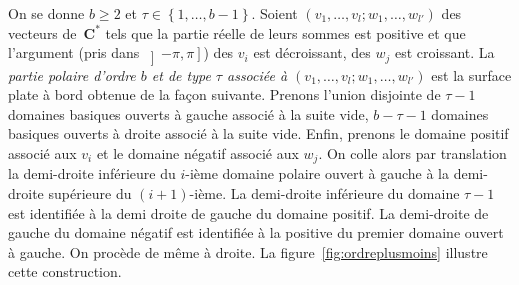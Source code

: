 \documentclass[11pt]{article}
\numberwithin{equation}{section}\renewcommand{\proofname}{Démonstration}
\newcommand{\CC}{\mathbf{C}}
\theoremstyle{definition}
\begin{document}
On se donne $b\geq2$ et $\tau\in\left\{1,\dots,b-1\right\}$.
Soient $(v_{1},\dots,v_{l};w_{1},\dots,w_{l'})$ des vecteurs de~$\CC^{\ast}$ tels que la partie réelle de leurs sommes est positive et que l'argument (pris dans $\left]-\pi,\pi\right]$) des $v_{i}$ est décroissant, des $w_{j}$ est croissant.
La \emph{partie polaire d'ordre $b$ et de type $\tau$ associée à $(v_{1},\dots,v_{l};w_{1},\dots,w_{l'})$} est la surface plate à bord obtenue de la façon suivante. Prenons l'union disjointe de $\tau-1$ domaines basiques ouverts à gauche associé à la suite vide, $b-\tau-1$ domaines basiques ouverts à droite associé à la suite vide. Enfin, prenons le domaine positif associé aux $v_{i}$ et le domaine négatif associé aux $w_{j}$. On colle alors par translation la demi-droite inférieure du $i$-ième domaine polaire ouvert à gauche à la demi-droite supérieure du $(i+1)$-ième. La demi-droite inférieure du domaine $\tau-1$ est identifiée à la demi droite de gauche du domaine positif. La demi-droite de gauche du domaine négatif est identifiée à la positive du premier domaine ouvert à gauche. On procède de même à droite. La figure~\ref{fig:ordreplusmoins} illustre cette construction.
\end{document}

